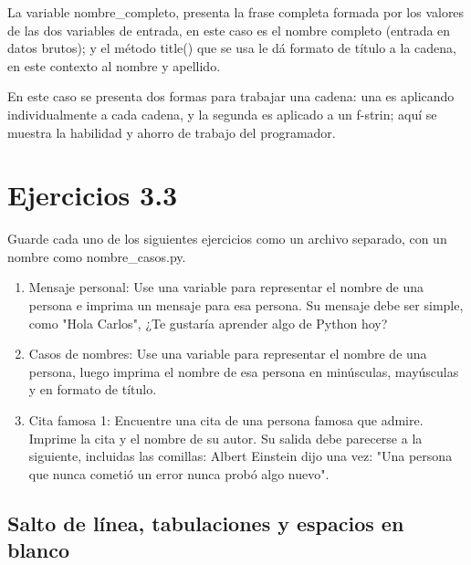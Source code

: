 La variable  {\ttfamily nombre\_completo},  presenta la frase completa formada por los valores de las dos variables de entrada,  en este caso es el nombre completo (entrada en datos brutos); y el método {\ttfamily title()} que se usa le dá formato de título a la cadena, en este contexto al nombre y apellido. 

En este caso se presenta dos formas para trabajar una cadena: una es aplicando individualmente a cada cadena,  y la segunda es aplicado a un {\ttfamily f-strin}; aquí  se muestra la  habilidad y ahorro de trabajo del programador.



\section*{Ejercicios 3.3}
Guarde cada uno de los siguientes ejercicios como un archivo separado, con un nombre como nombre\_casos.py. 


\begin{enumerate}[3.3.1]
	
	\item Mensaje personal: Use una variable para representar el nombre de una persona e imprima
	un mensaje para esa persona. Su mensaje debe ser simple, como "Hola Carlos", ¿Te gustaría aprender algo de Python hoy?
	
	\item Casos de nombres: Use una variable para representar el nombre de una persona,  luego imprima
	el nombre de esa persona en minúsculas, mayúsculas y en formato de título.
	
	\item Cita famosa 1: Encuentre una cita de una persona famosa que admire. Imprime la cita y el nombre de su autor.
	Su salida debe parecerse a la siguiente, incluidas las comillas:
	Albert Einstein dijo una vez: "{}Una persona que nunca cometió un error nunca probó algo nuevo".
\end{enumerate}

\subsection{Salto de línea, tabulaciones y espacios en blanco} %

